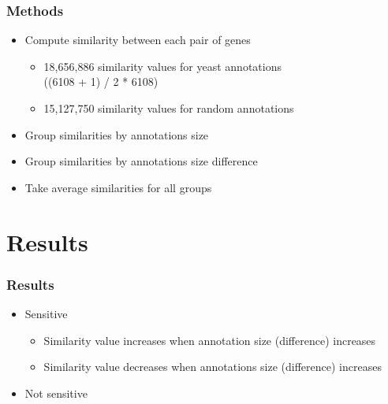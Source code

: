 \documentclass{beamer}
\begin{document}
\begin{frame}
\frametitle{Methods}
\begin{itemize}
\item Compute similarity between each pair of genes
\begin{itemize}
\item 18,656,886 similarity values for yeast annotations \\ ((6108 + 1) / 2 * 6108)
\item 15,127,750 similarity values for random annotations
\end{itemize}
\item Group similarities by annotations size 
\item Group similarities by annotations size difference
\item Take average similarities for all groups
\end{itemize}

\end{frame}

\section{Results}

\begin{frame}
\frametitle{Results}
\begin{itemize}
\item Sensitive
\begin{itemize}
\item Similarity value increases when annotation size (difference) increases
\item Similarity value decreases when annotations size (difference) increases
\end{itemize}
\item Not sensitive 
\end{itemize}

\end{frame}
\end{document}
